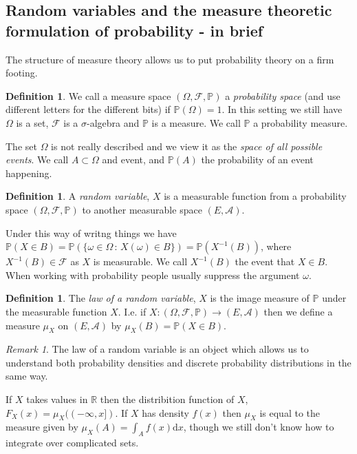 \documentclass[11pt]{article}
\theoremstyle{definition}
\newtheorem{dfn}[thm]{Definition}
\theoremstyle{remark}
\newtheorem{remark}[thm]{Remark}
\begin{document}
\subsection{Random variables and the measure theoretic formulation of probability - in brief}
The structure of measure theory allows us to put probability theory on a firm footing. 
\begin{dfn}
We call a measure space $(\Omega, \mathcal{F}, \mathbb{P})$ a \emph{probability space} (and use different letters for the different bits) if $\mathbb{P}(\Omega) = 1$. In this setting we still have $\Omega$ is a set, $\mathcal{F}$ is a $\sigma$-algebra and $\mathbb{P}$ is a measure. We call $\mathbb{P}$ a probability measure. 
\end{dfn}
The set $\Omega$ is not really described and we view it as the \emph{space of all possible events}. We call $A \subset \Omega$ and event, and $\mathbb{P}(A)$ the probability of an event happening. 

\begin{dfn}
A \emph{random variable}, $X$ is a measurable function from a probability space $(\Omega, \mathcal{F}, \mathbb{P})$ to another measurable space $(E, \mathcal{A})$.
\end{dfn}
Under this way of writng things we have $\mathbb{P}(X \in B) = \mathbb{P}(\{ \omega \in \Omega \,:\, X(\omega) \in B\}) = \mathbb{P}( X^{-1}(B))$, where $X^{-1}(B) \in \mathcal{F}$ as $X$ is measurable. We call $X^{-1}(B)$ the event that $X \in B$. When working with probability people usually suppress the argument $\omega$.

\begin{dfn}
The \emph{law of a random variable}, $X$ is the image measure of $\mathbb{P}$ under the measurable function $X$. I.e. if $X: (\Omega, \mathcal{F}, \mathbb{P}) \rightarrow (E, \mathcal{A})$ then we define a measure $\mu_X$ on $(E, \mathcal{A})$ by $\mu_X(B) = \mathbb{P}(X \in B)$.
\end{dfn}
\begin{remark}
The law of a random variable is an object which allows us to understand both probability densities and discrete probability distributions in the same way.

If $X$ takes values in $\mathbb{R}$ then the distribition function of $X$, $F_X(x) = \mu_X((-\infty, x])$. If $X$ has density $f(x)$ then $\mu_X$ is equal to the measure given by $\mu_X(A) = \int_A f(x) \mathrm{d}x$, though we still don't know how to integrate over complicated sets.
\end{remark}
\end{document}
